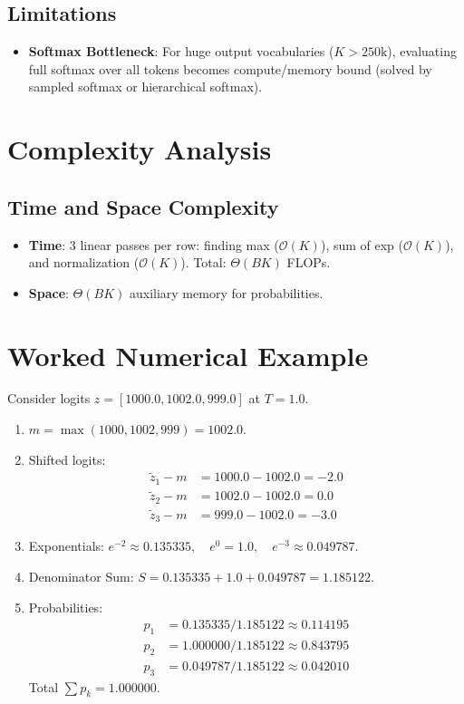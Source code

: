 \documentclass[11pt,a4paper]{article}
\theoremstyle{definition}
\begin{document}
\subsection{Limitations}
\begin{itemize}
    \item \textbf{Softmax Bottleneck}: For huge output vocabularies ($K > 250\text{k}$), evaluating full softmax over all tokens becomes compute/memory bound (solved by sampled softmax or hierarchical softmax).
\end{itemize}

\section{Complexity Analysis}

\subsection{Time and Space Complexity}
\begin{itemize}
    \item \textbf{Time}: 3 linear passes per row: finding max ($\mathcal{O}(K)$), sum of exp ($\mathcal{O}(K)$), and normalization ($\mathcal{O}(K)$). Total: $\Theta(BK)$ FLOPs.
    \item \textbf{Space}: $\Theta(BK)$ auxiliary memory for probabilities.
\end{itemize}

\section{Worked Numerical Example}

Consider logits $z = [1000.0, 1002.0, 999.0]$ at $T=1.0$.

\begin{enumerate}
    \item $m = \max(1000, 1002, 999) = 1002.0$.
    \item Shifted logits:
    \begin{align}
    \tilde{z}_1 - m &= 1000.0 - 1002.0 = -2.0 \\
    \tilde{z}_2 - m &= 1002.0 - 1002.0 = 0.0 \\
    \tilde{z}_3 - m &= 999.0 - 1002.0 = -3.0
    \end{align}
    \item Exponentials:
    $e^{-2} \approx 0.135335, \quad e^0 = 1.0, \quad e^{-3} \approx 0.049787$.
    \item Denominator Sum:
    $S = 0.135335 + 1.0 + 0.049787 = 1.185122$.
    \item Probabilities:
    \begin{align}
    p_1 &= 0.135335 / 1.185122 \approx 0.114195 \\
    p_2 &= 1.000000 / 1.185122 \approx 0.843795 \\
    p_3 &= 0.049787 / 1.185122 \approx 0.042010
    \end{align}
    Total $\sum p_k = 1.000000$.
\end{enumerate}
\end{document}

